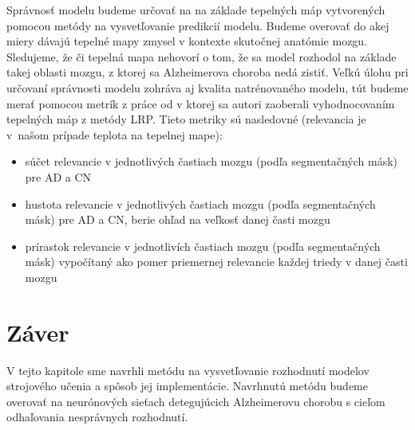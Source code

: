 Správnosť modelu budeme určovať na na základe tepelných máp vytvorených pomocou metódy na vysvetľovanie predikcií modelu. Budeme overovať do akej miery dávajú tepelné mapy zmysel v kontexte skutočnej anatómie mozgu. Sledujeme, že či tepelná mapa nehovorí o tom, že sa model rozhodol na základe takej oblasti mozgu, z ktorej sa Alzheimerova choroba nedá zistiť. Veľkú úlohu pri určovaní správnosti modelu zohráva aj kvalita natrénovaného modelu, tút budeme merať pomocou metrík z práce od \citeauthor*{bohle2019layer} v ktorej sa autori zaoberali vyhodnocovaním tepelných máp z metódy LRP. Tieto metriky sú nasledovné (relevancia je v našom prípade teplota na tepelnej mape):

\begin{itemize}
    \item súčet relevancie v jednotlivých častiach mozgu (podľa segmentačných másk) pre AD a CN
    \item hustota relevancie v jednotlivých častiach mozgu (podľa segmentačných másk) pre AD a CN, berie ohľad na veľkosť danej časti mozgu
    \item prírastok relevancie v jednotlivích častiach mozgu (podľa segmentačných másk) vypočítaný ako pomer priemernej relevancie každej triedy v danej časti mozgu
\end{itemize}

\section{Záver}

V tejto kapitole sme navrhli metódu na vysvetľovanie rozhodnutí modelov strojového učenia a spôsob jej implementácie. Navrhnutú metódu budeme overovať na neurónových sieťach detegujúcich Alzheimerovu chorobu s cieľom odhaľovania nesprávnych rozhodnutí.
